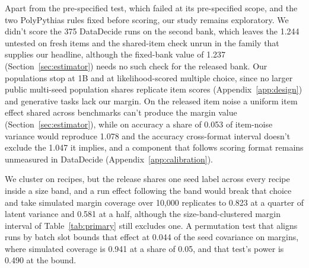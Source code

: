 Apart from the pre-specified test, which failed at its pre-specified scope, and the two PolyPythias rules fixed before scoring, our study remains exploratory. We didn't score the 375 DataDecide runs on the second bank, which leaves the 1.244 untested on fresh items and the shared-item check unrun in the family that supplies our headline, although the fixed-bank value of 1.237 (Section~\ref{sec:estimator}) needs no such check for the released bank. Our populations stop at 1B and at likelihood-scored multiple choice, since no larger public multi-seed population shares replicate item scores (Appendix~\ref{app:design}) and generative tasks lack our margin. On the released item noise a uniform item effect shared across benchmarks can't produce the margin value (Section~\ref{sec:estimator}), while on accuracy a share of 0.053 of item-noise variance would reproduce 1.078 and the accuracy cross-format interval  doesn't exclude the 1.047 it implies, and a component that follows scoring format remains unmeasured in DataDecide (Appendix~\ref{app:calibration}).

We cluster on recipes, but the release shares one seed label across every recipe inside a size band, and a run effect following the band would break that choice and take simulated margin coverage over 10,000 replicates to 0.823 at a quarter of latent variance and 0.581 at a half, although the size-band-clustered margin interval  of Table~\ref{tab:primary} still excludes one. A permutation test that aligns runs by batch slot bounds that effect at 0.044 of the seed covariance on margins, where simulated coverage is 0.941 at a share of 0.05, and that test's power is 0.490 at the bound.

